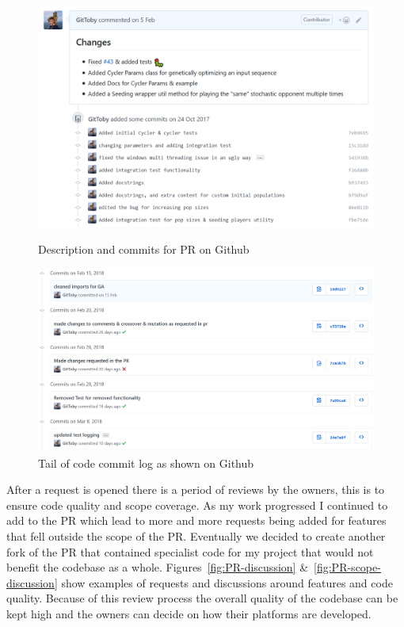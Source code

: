 \begin{figure}[ht]
    \centering
    \begin{minipage}{0.48\textwidth}
        \centering
        \includegraphics[width=1.0\textwidth, center]{./img/vcs/PR-Open.png}
        \caption{Description and commits for PR on Github}\label{fig:PR-open}
    \end{minipage}\hfill
    \begin{minipage}{0.48\textwidth}
        \centering
        \includegraphics[width=1.0\textwidth, center,keepaspectratio]{./img/vcs/commit-log.png}    
        \caption{Tail of code commit log as shown on Github}\label{fig:commit-log}
    \end{minipage}
\end{figure}

After a request is opened there is a period of reviews by the owners, this is to ensure code quality and scope coverage. 
As my work progressed I continued to add to the PR which lead to more and more requests being added for features that fell outside the scope of the PR.
Eventually we decided to create another fork of the PR that contained specialist code for my project that would not benefit the codebase as a whole.
Figures~\ref{fig:PR-discussion} \&~\ref{fig:PR-scope-discussion} show examples of requests and discussions around features and code quality.
Because of this review process the overall quality of the codebase can be kept high and the owners can decide on how their platforms are developed.

